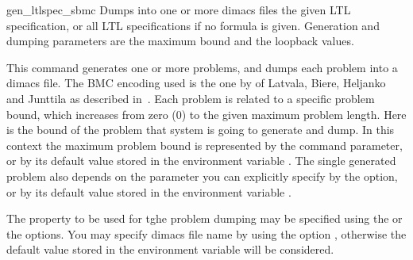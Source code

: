 \begin{nusmvCommand} {gen\_ltlspec\_sbmc} {\label{genLtlspecSbmc} 
Dumps into one or more dimacs files the given LTL specification, or
all LTL specifications if no formula is given. Generation and dumping
parameters are the maximum bound and the loopback values.}


This command generates one or more problems, and dumps each problem
into a dimacs file. The BMC encoding used is the one by of Latvala,
Biere, Heljanko and Junttila as described in~\cite{vmcai05}.
%
Each problem is related to a specific problem bound, which
increases from zero ($0$) to the given maximum problem length. Here
 is the bound of the problem that system is going to
generate and dump.  In this context the maximum problem bound is
represented by the  command parameter, or by its default
value stored in the environment variable .  The
single generated problem also depends on the  parameter
you can explicitly specify by the  option, or by its
default value stored in the environment variable
.

The property to be used for tghe problem dumping may be specified
using the  or the  options.
You may specify dimacs file name by using the option , otherwise the default value stored in the environment
variable  will be considered.

\begin{cmdOpt}

       
            



\end{cmdOpt}
\end{nusmvCommand}
